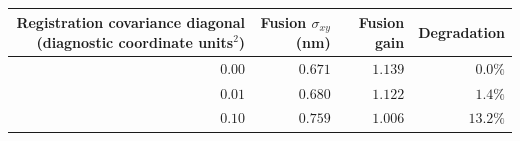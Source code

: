 \begin{tabular}{r r r r}
\toprule
Registration covariance diagonal (diagnostic coordinate units$^2$) & Fusion $\sigma_{xy}$ (nm) & Fusion gain & Degradation \\
\midrule
$0.00$ & $0.671$ & $1.139$ & $0.0\%$ \\
$0.01$ & $0.680$ & $1.122$ & $1.4\%$ \\
$0.10$ & $0.759$ & $1.006$ & $13.2\%$ \\
\bottomrule
\end{tabular}
